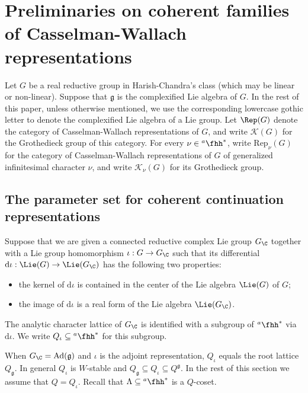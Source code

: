 \documentclass[12pt,a4paper]{amsart}
\def\subset{\subseteq}
\newcommand{\CK}{{\mathcal {K}}}
\newcommand{\g}{\mathfrak g}
\numberwithin{equation}{section}
\theoremstyle{remark}
\def\hha{{}^a\fhh}
\begin{document}
\section{Preliminaries  on coherent families of Casselman-Wallach representations}




Let $G$ be a real reductive group in Harish-Chandra's class (which may be
linear or non-linear). Suppose that $\g$ is the complexified Lie algebra of $G$. In the rest of  this paper, unless otherwise mentioned, we use the corresponding lowercase gothic letter to denote the complexified Lie algebra of a Lie group. Let $\Rep(G)$ denote the category of Casselman-Wallach representations of $G$, and write $\CK(G)$ for the Grothedieck group of this category.
For every $\nu\in \hha^*$, write $\mathrm{Rep}_\nu(G)$ for the category of Casselman-Wallach representations of $G$ of generalized infinitesimal character $\nu$, and write   $\CK_{\nu}(G)$ for its  Grothedieck group.




\subsection{The parameter set for  coherent continuation representations}\label{extcoh}

Suppose that we are given a connected reductive complex Lie group $G_\C$ together with a Lie group homomorphism $\iota: G\rightarrow G_\C$ such that its differential $\mathrm d \iota: \Lie(G)\rightarrow \Lie(G_\C)$ has the following two properties:
\begin{itemize}
  \item the kernel of $\mathrm d \iota$ is contained in the center of the Lie algebra $ \Lie(G)$ of $G$;
  \item the image of  $\mathrm d \iota$ is a real form  of the Lie algebra $ \Lie(G_\C)$.
\end{itemize}
The  analytic character lattice of $ G_\C$ is identified with a subgroup of $\hha^*$ via $\mathrm d\iota$. We write $Q_\iota\subset \hha^*$ for this subgroup.

When $G_\C=\mathrm{Ad}(\g)$ and $\iota$ is the adjoint representation, $Q_\iota$ equals the root lattice $Q_\g$. In general $Q_\iota$ is $W$-stable and $Q_\g\subseteq Q_\iota \subseteq Q^\g$.
In the rest of this section we assume that $Q=Q_\iota$. Recall that $\Lambda\subset \hha^*$ is a $Q$-coset.
\end{document}
